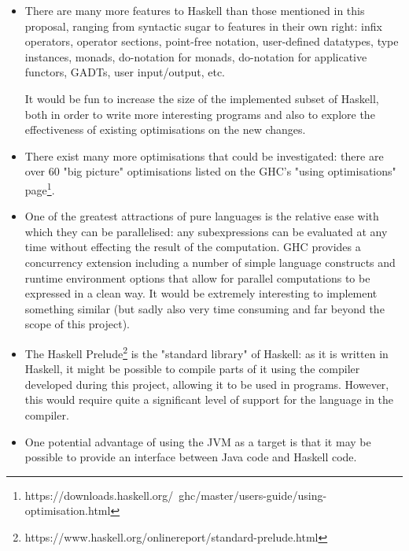 \documentclass[12pt]{article}
\begin{document}
\begin{itemize}
\item
{

    There are many more features to Haskell than those mentioned in this proposal, ranging from syntactic sugar to
    features in their own right: infix operators, operator sections, point-free notation, user-defined datatypes, type
    instances, monads, do-notation for monads, do-notation for applicative functors, GADTs, user input/output, etc.

    It would be fun to increase the size of the implemented subset of Haskell, both in order to write more interesting
    programs and also to explore the effectiveness of existing optimisations on the new changes.

}
\item
{

    There exist many more optimisations that could be investigated: there are over 60 "big picture" optimisations listed
    on the GHC's "using optimisations"
    page\footnote{https://downloads.haskell.org/~ghc/master/users-guide/using-optimisation.html}.

}
\item
{

    One of the greatest attractions of pure languages is the relative ease with which they can be parallelised: any
    subexpressions can be evaluated at any time without effecting the result of the computation. GHC provides a
    concurrency extension including a number of simple language constructs and runtime environment options that allow
    for parallel computations to be expressed in a clean way. It would be extremely interesting to implement something
    similar (but sadly also very time consuming and far beyond the scope of this project).

}
\item
{

    The Haskell Prelude\footnote{https://www.haskell.org/onlinereport/standard-prelude.html} is the "standard library"
    of Haskell: as it is written in Haskell, it might be possible to compile parts of it using the compiler developed
    during this project, allowing it to be used in programs. However, this would require quite a significant level of
    support for the language in the compiler.

}
\item
{

    One potential advantage of using the JVM as a target is that it may be possible to provide an interface between Java
    code and Haskell code.

}
\end{itemize}
\end{document}

